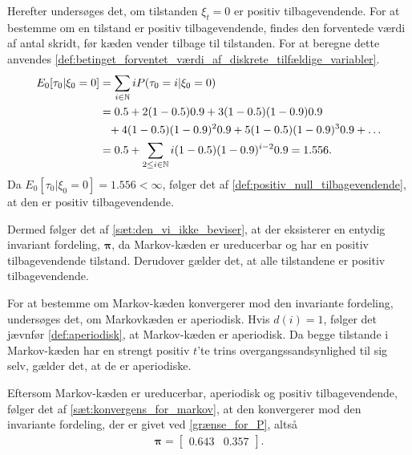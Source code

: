 Herefter undersøges det, om tilstanden $\xi_t = 0$ er positiv tilbagevendende. For at bestemme om en tilstand er positiv tilbagevendende, findes den forventede værdi af antal skridt, før kæden vender tilbage til tilstanden. For at beregne dette anvendes \autoref{def:betinget_forventet_værdi_af_diskrete_tilfældige_variabler}.
 \begin{align*}
     E_0[\tau_{0}|\xi_0=0]&=\sum_{i\in \mathbb{N}} iP(\tau_{0}=i|\xi_0=0)\\
     &=0.5+2(1-0.5)0.9+3(1-0.5)(1-0.9)0.9\\
     &\phantom{=} +4(1-0.5)(1-0.9)^20.9+5(1-0.5)(1-0.9)^30.9+\ldots\\
     &=0.5 + \sum_{2\leq i \in \mathbb{N} } i(1-0.5)(1-0.9)^{i-2}0.9 = 1.556.
 \end{align*}
Da $E_0[\tau_{0}|\xi_0=0]=1.556<\infty$, følger det af \autoref{def:positiv_null_tilbagevendende}, at den er positiv tilbagevendende.

Dermed følger det af \autoref{sæt:den_vi_ikke_beviser}, at der eksisterer en entydig invariant fordeling, $\bm \pi$, da Markov-kæden er ureducerbar og har en positiv tilbagevendende tilstand. Derudover gælder det, at alle tilstandene er positiv tilbagevendende.


For at bestemme om Markov-kæden konvergerer mod den invariante fordeling, undersøges det, om Markovkæden er aperiodisk. Hvis $d(i)=1$, følger det jævnfør \autoref{def:aperiodisk}, at Markov-kæden er aperiodisk. Da begge tilstande i Markov-kæden har en strengt positiv $t$'te trins overgangssandsynlighed til sig selv, gælder det, at de er aperiodiske. 

Eftersom Markov-kæden er ureducerbar, aperiodisk og positiv tilbagevendende, følger det af \autoref{sæt:konvergens_for_markov}, at den konvergerer mod den invariante fordeling, der er givet ved \eqref{grænse_for_P}, altså
\begin{align}
    \bm \pi = \begin{bmatrix} 0.643 & 0.357\end{bmatrix}.
\end{align}

